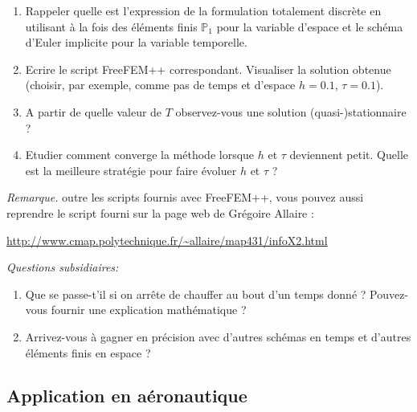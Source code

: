 \begin{enumerate}

\item Rappeler quelle est l'expression de la formulation totalement discrète en utilisant à la fois des éléments finis $\mathbb{P}_1$ pour la variable d'espace et le schéma d'Euler implicite pour la variable temporelle. 

\item Ecrire le script FreeFEM++ correspondant. Visualiser la solution obtenue (choisir, par exemple, comme pas de temps et d'espace $h=0.1$, $\tau = 0.1$).

\item A partir de quelle valeur de $T$ observez-vous une solution (quasi-)stationnaire ?

\item Etudier comment converge la méthode lorsque $h$ et $\tau$ deviennent petit. Quelle est la meilleure stratégie pour faire évoluer $h$ et $\tau$ ?


\end{enumerate}

{\it Remarque.} outre les scripts fournis avec FreeFEM++, vous pouvez aussi reprendre le script fourni sur la page web de Grégoire Allaire : 

\begin{center}
\url{http://www.cmap.polytechnique.fr/~allaire/map431/infoX2.html}
\end{center}

{\it Questions subsidiaires:

\begin{enumerate}

\item Que se passe-t'il si on arrête de chauffer au bout d'un temps donné ? Pouvez-vous fournir une explication mathématique ?

\item Arrivez-vous à gagner en précision avec d'autres schémas en temps et d'autres éléments finis en espace ?

\end{enumerate}

}

\subsection{Application en aéronautique}

